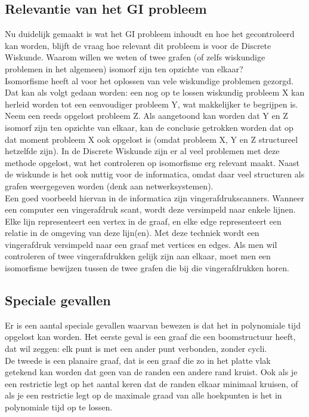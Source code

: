 \documentclass{article}
\begin{document}
\subsection{Relevantie van het GI probleem}
Nu duidelijk gemaakt is wat het GI probleem inhoudt en hoe het gecontroleerd kan worden, blijft de vraag hoe relevant dit probleem is voor de Discrete Wiskunde. Waarom willen we weten of twee grafen (of zelfs wiskundige problemen in het algemeen) isomorf zijn ten opzichte van elkaar?\\

Isomorfisme heeft al voor het oplossen van vele wiskundige problemen gezorgd. Dat kan als volgt gedaan worden: een nog op te lossen wiskundig probleem X kan herleid worden tot een eenvoudiger probleem Y, wat makkelijker te begrijpen is. Neem een reeds opgelost probleem Z. Als aangetoond kan worden dat Y en Z isomorf zijn ten opzichte van elkaar, kan de conclusie getrokken worden dat op dat moment probleem X ook opgelost is (omdat probleem X, Y en Z structureel hetzelfde zijn). In de Discrete Wiskunde zijn er al veel problemen met deze methode opgelost, wat het controleren op isomorfisme erg relevant maakt.
Naast de wiskunde is het ook nuttig voor de informatica, omdat daar veel structuren als grafen weergegeven worden (denk aan netwerksystemen).\\

Een goed voorbeeld hiervan in de informatica zijn vingerafdrukscanners. Wanneer een computer een vingerafdruk scant, wordt deze versimpeld naar enkele lijnen. Elke lijn representeert een vertex in de graaf, en elke edge representeert een relatie in de omgeving van deze lijn(en). Met deze techniek wordt een vingerafdruk versimpeld naar een graaf met vertices en edges. Als men wil controleren of twee vingerafdrukken gelijk zijn aan elkaar, moet men een isomorfisme bewijzen tussen de twee grafen die bij die vingerafdrukken horen.

\subsection{Speciale gevallen}
Er is een aantal speciale gevallen waarvan bewezen is dat het in polynomiale tijd opgelost kan worden. Het eerste geval is een graaf die een boomstructuur heeft, dat wil zeggen: elk punt is met een ander punt verbonden, zonder cycli.\\
De tweede is een planaire graaf, dat is een graaf die zo in het platte vlak getekend kan worden dat geen van de randen een andere rand kruist. Ook als je een restrictie legt op het aantal keren dat de randen elkaar minimaal kruisen, of als je een restrictie legt op de maximale graad van alle hoekpunten is het in polynomiale tijd op te lossen.
\pagebreak
\end{document}
